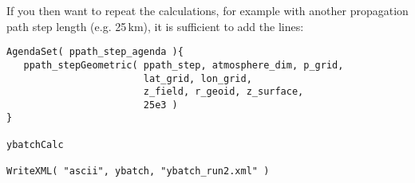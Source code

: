 If you then want to repeat the calculations, for example with another
propagation path step length (e.g. 25\,km), it is sufficient to add
the lines:

\begin{verbatim}
AgendaSet( ppath_step_agenda ){
   ppath_stepGeometric( ppath_step, atmosphere_dim, p_grid,
                        lat_grid, lon_grid,
                        z_field, r_geoid, z_surface,
                        25e3 )
}

ybatchCalc

WriteXML( "ascii", ybatch, "ybatch_run2.xml" )
\end{verbatim}


